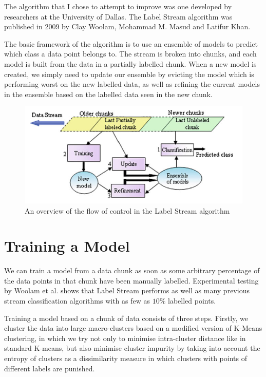 \documentclass[12pt,a4paper,oneside]{report}
\begin{document}
The algorithm that I chose to attempt to improve was one developed by researchers at the University of Dallas. The Label Stream algorithm was published in 2009 by Clay Woolam, Mohammad M. Masud and Latifur Khan.\cite{LabStr}

The basic framework of the algorithm is to use an ensemble of models to predict which class a data point belongs to. The stream is broken into chunks, and each model is built from the data in a partially labelled chunk.  When a new model is created, we simply need to update our ensemble by evicting the model which is performing worst on the new labelled data, as well as refining the current models in the ensemble based on the labelled data seen in the new chunk. 
\begin{figure}
	\includegraphics[scale = 0.4]{LabStrOverview}
	\caption{An overview of the flow of control in the Label Stream algorithm \cite{TechRep}}
\end{figure}

\section{Training a Model}

We can train a model from a data chunk as soon as some arbitrary percentage of the data points in that chunk have been manually labelled. Experimental testing by Woolam et al. shows that Label Stream performs as well as many previous stream classification algorithms with as few as \(10\%\) labelled points.\cite{LabStr}

Training a model based on a chunk of data consists of three steps. Firstly, we cluster the data into large macro-clusters based on a modified version of K-Means clustering, in which we try not only to minimise intra-cluster distance like in standard K-means, but also minimise cluster impurity by taking into account the entropy of clusters as a dissimilarity measure in which clusters with points of different labels are punished. 
\end{document}
